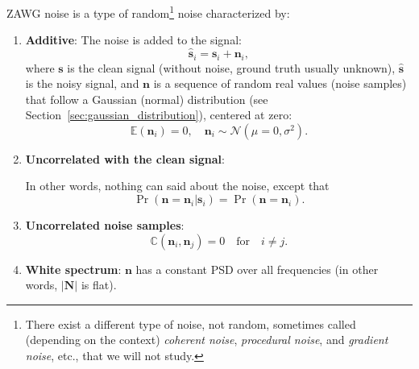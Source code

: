 \gls{ZAWG} noise is a type of random\footnote{There exist a different
  type of noise, not random, sometimes called (depending on the
  context) \emph{coherent noise}, \emph{procedural noise}, and
  \emph{gradient noise}, etc., that we will not study.} noise
characterized by:
\begin{enumerate}

\item \textbf{Additive}: The noise is added to the signal:
  \begin{equation}
    \hat{\mathbf{s}}_i = {\mathbf{s}}_i + {\mathbf{n}}_i,
    \label{eq:ZAWG_i}
  \end{equation}
  where $\mathbf{s}$ is the clean signal (without noise, ground truth
  usually unknown), $\hat{\mathbf{s}}$ is the noisy signal, and
  ${\mathbf{n}}$ is a sequence of random real values (noise samples)
  that follow a Gaussian (normal) distribution (see
  Section~\ref{sec:gaussian_distribution}), centered at zero:
  \begin{equation} 
    \mathbb{E}(\mathbf{n}_i) = 0,\quad {\mathbf n}_i\sim{\mathcal N}(\mu=0,\sigma^2).
  \end{equation}

\item \textbf{Uncorrelated with the clean signal}: %
\begin{comment}
\end{comment}
  In other words, nothing can said about the noise, except that
  \begin{equation}
    \Pr(\mathbf{n}{=}\mathbf{n}_i|\mathbf{s}_i) = \Pr(\mathbf{n}{=}\mathbf{n}_i).
  \end{equation}
\begin{comment}
  Moreover, because $\mathbf{s}$ is unknown, 
  \begin{equation}
    \Pr(\mathbf{n}{=}\mathbf{n}_i|\hat{\mathbf{s}}_i) = \Pr(\mathbf{n}{=}\mathbf{n}_i).
  \end{equation}
\end{comment}

\item \textbf{Uncorrelated noise samples}:
  \begin{equation}
    \mathbb{C}(\mathbf{n}_i,\mathbf{n}_j) = 0 \quad \text{for} \quad i\neq j.
  \end{equation}
  
\item \textbf{White spectrum}: $\mathbf{n}$ has a constant \gls{PSD} over all frequencies (in
  other words, $|\mathbf{N}|$ is flat).
  
\end{enumerate}

